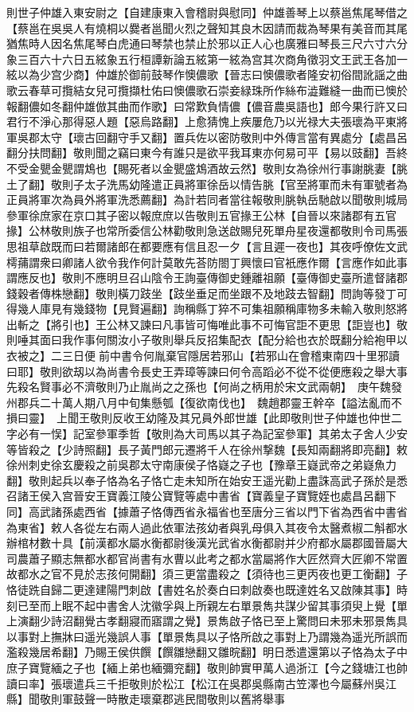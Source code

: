 則世子仲雄入東安尉之【自建康東入會稽尉與慰同】仲雄善琴上以蔡邕焦尾琴借之【蔡邕在吳吳人有燒桐以爨者邕聞火烈之聲知其良木因請而裁為琴果有美音而其尾猶焦時人因名焦尾琴白虎通曰琴禁也禁止於邪以正人心也廣雅曰琴長三尺六寸六分象三百六十六日五絃象五行桓譚新論五絃第一絃為宫其次商角徵羽文王武王各加一絃以為少宫少商】仲雄於御前鼓琴作懊儂歌【晉志曰懊儂歌者隆安初俗間訛謡之曲歌云春草可攬結女兒可攬擷杜佑曰懊儂歌石崇妾緑珠所作絲布澁難縫一曲而已懊於報翻儂如冬翻仲雄倣其曲而作歌】曰常歎負情儂【儂音農吳語也】郎今果行許又曰君行不淨心那得惡人題【惡烏路翻】上愈猜愧上疾屢危乃以光禄大夫張瓌為平東將軍吳郡太守【瓌古回翻守手又翻】置兵佐以密防敬則中外傳言當有異處分【處昌呂翻分扶問翻】敬則聞之竊曰東今有誰只是欲平我耳東亦何易可平【易以豉翻】吾終不受金甖金甖謂鴆也【賜死者以金甖盛鴆酒故云然】敬則女為徐州行事謝朓妻【朓土了翻】敬則子太子洗馬幼隆遣正員將軍徐岳以情告脁【官至將軍而未有軍號者為正員將軍次為員外將軍洗悉薦翻】為計若同者當往報敬則朓執岳馳啟以聞敬則城局參軍徐庶家在京口其子密以報庶庶以告敬則五官掾王公林【自晉以來諸郡有五官掾】公林敬則族子也常所委信公林勸敬則急送啟賜兒死單舟星夜還都敬則令司馬張思祖草啟既而曰若爾諸郎在都要應有信且忍一夕【言且遲一夜也】其夜呼僚佐文武樗蒱謂衆曰卿諸人欲令我作何計莫敢先荅防閤丁興懷曰官衹應作爾【言應作如此事謂應反也】敬則不應明旦召山陰令王詢臺傳御史鍾離祖願【臺傳御史臺所遣督諸郡錢穀者傳株戀翻】敬則橫刀跂坐【跂坐垂足而坐跟不及地跂去智翻】問詢等發丁可得幾人庫見有幾錢物【見賢遍翻】詢稱縣丁猝不可集祖願稱庫物多未輸入敬則怒將出斬之【將引也】王公林又諫曰凡事皆可悔唯此事不可悔官詎不更思【詎豈也】敬則唾其面曰我作事何關汝小子敬則舉兵反招集配衣【配分給也衣於既翻分給袍甲以衣被之】二三日便前中書令何胤棄官隱居若邪山【若邪山在會稽東南四十里邪讀曰耶】敬則欲刼以為尚書令長史王弄璋等諫曰何令高蹈必不從不從便應殺之舉大事先殺名賢事必不濟敬則乃止胤尚之之孫也【何尚之柄用於宋文武兩朝】　庚午魏發州郡兵二十萬人期八月中旬集懸瓠【復欲南伐也】　魏趙郡靈王幹卒【謚法亂而不損曰靈】　上聞王敬則反收王幼隆及其兄員外郎世雄【此即敬則世子仲雄也仲世二字必有一悮】記室參軍季哲【敬則為大司馬以其子為記室參軍】其弟太子舍人少安等皆殺之【少詩照翻】長子黃門郎元遷將千人在徐州撃魏【長知兩翻將即亮翻】敕徐州刺史徐玄慶殺之前吳郡太守南康侯子恪嶷之子也【豫章王嶷武帝之弟嶷魚力翻】敬則起兵以奉子恪為名子恪亡走未知所在始安王遥光勸上盡誅高武子孫於是悉召諸王侯入宫晉安王寶義江陵公寶覽等處中書省【寶義皇子寶覽姪也處昌呂翻下同】高武諸孫處西省【據蕭子恪傳西省永福省也至唐分三省以門下省為西省中書省為東省】敕人各從左右兩人過此依軍法孩幼者與乳母俱入其夜令太醫煮椒二斛都水辦棺材數十具【前漢都水屬水衡都尉後漢光武省水衡都尉并少府都水屬郡國晉屬大司農蕭子顯志無都水都官尚書有水曹以此考之都水當屬將作大匠然齊大匠卿不常置故都水之官不見於志孩何開翻】須三更當盡殺之【須待也三更丙夜也更工衡翻】子恪徒跣自歸二更達建陽門刺啟【書姓名於奏白曰刺啟奏也既達姓名又啟陳其事】時刻已至而上眠不起中書舍人沈徽孚與上所親左右單景雋共謀少留其事須臾上覺【單上演翻少詩沼翻覺古孝翻寢而寤謂之覺】景雋啟子恪已至上驚問曰未邪未邪景雋具以事對上撫牀曰遥光幾誤人事【單景雋具以子恪所啟之事對上乃謂幾為遥光所誤而濫殺幾居希翻】乃賜王侯供饌【饌雛戀翻又雛晥翻】明日悉遣還第以子恪為太子中庶子寶覽緬之子也【緬上弟也緬彌兖翻】敬則帥實甲萬人過浙江【今之錢塘江也帥讀曰率】張瓌遣兵三千拒敬則於松江【松江在吳郡吳縣南古笠澤也今屬蘇州吳江縣】聞敬則軍鼓聲一時散走瓌棄郡逃民間敬則以舊將舉事